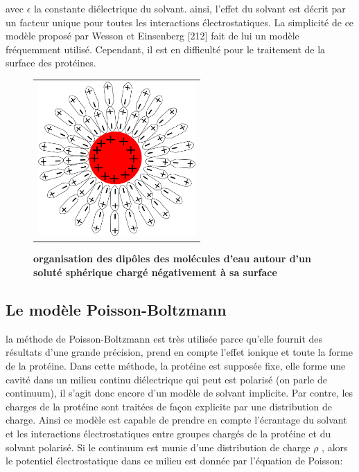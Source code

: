 avec $ \epsilon $ la constante diélectrique du solvant.
ainsi, l'effet du solvant  est décrit par un facteur unique pour toutes les interactions électrostatiques. La simplicité de ce modèle proposé par Wesson et Einsenberg [212] fait de lui un modèle fréquemment utilisé. Cependant, il est en difficulté pour le traitement de la surface des protéines.


   \begin{figure}[!htbp]
     \centering
     \begin{tabular}{c}
       \includegraphics[width=6cm]{figure/ecrantage.png} &
     \end{tabular}
     
     \caption{\textbf{organisation des dipôles des molécules d'eau autour d'un soluté sphérique chargé négativement à sa surface}}
\label{graph:ecrantage}
   \end{figure}
   


\subsection{Le modèle Poisson-Boltzmann}
la méthode de Poisson-Boltzmann est très utilisée parce qu'elle fournit des résultats d'une grande précision, prend en compte l'effet ionique et toute la forme de la protéine. Dans cette méthode, la protéine est supposée fixe, elle forme une cavité dans un milieu continu diélectrique qui peut est polarisé (on parle de continuum), il s'agit donc encore d'un modèle de solvant implicite. Par contre, les charges de la protéine sont traitées de façon explicite par une distribution de charge. Ainsi ce modèle est capable de prendre en compte l'écrantage du solvant et les interactions électrostatiques entre groupes chargés de la protéine et du solvant polarisé. Si le continuum est munie d'une distribution de charge $\rho$ , alors le potentiel électrostatique dans ce milieu est donnée par l'équation de Poisson:

